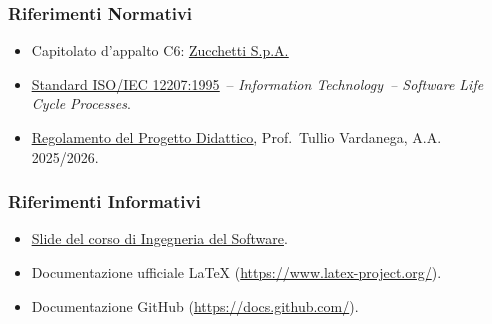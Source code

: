 \subsubsection{Riferimenti Normativi}
 
\begin{itemize}
  \item Capitolato d'appalto C6:
        \href{https://www.math.unipd.it/~tullio/IS-1/2025/Progetto/C6p.pdf}
             {\underline{Zucchetti S.p.A.}}
  \item \href{https://synergo-unit-unipd.github.io/Second-Brain/docs/ISO_12207-1995.pdf"}
     {\underline{Standard ISO/IEC 12207:1995}}~-- \textit{Information Technology~-- Software
        Life Cycle Processes}.
  \item \href{https://www.math.unipd.it/~tullio/IS-1/2025/Dispense/PD1.pdf}{\underline{Regolamento del Progetto Didattico}}, Prof.\ Tullio Vardanega,
        A.A. 2025/2026. 
\end{itemize}
 
\subsubsection{Riferimenti Informativi}
 
\begin{itemize}
  \item \href{https://docs.google.com/spreadsheets/d/1TqTueqg0v_PCngLsy95M_N9lYOknyqfpg0YwvzMMspU/edit?gid=0#gid=0&range=B7:F7}
             {\underline{Slide del corso di Ingegneria del Software}}.
  \item Documentazione ufficiale \LaTeX{} (\url{https://www.latex-project.org/}).
  \item Documentazione GitHub (\url{https://docs.github.com/}).
\end{itemize}